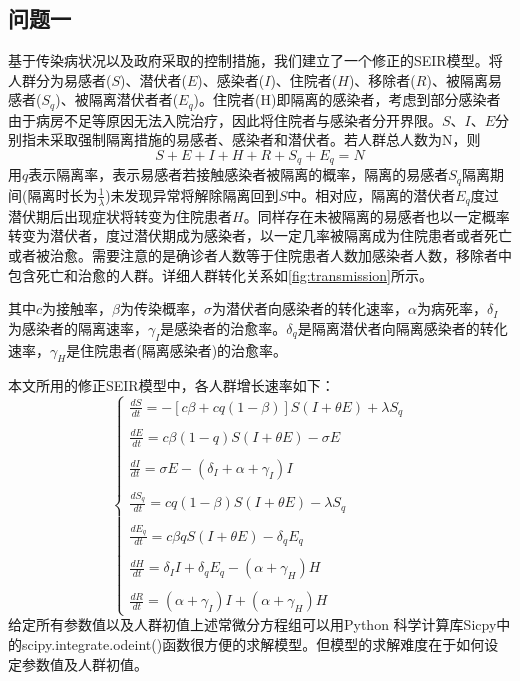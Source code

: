 \documentclass[withoutpre]{cumcmthesis} %
\begin{document}
\subsection{问题一}
基于传染病状况以及政府采取的控制措施，我们建立了一个修正的SEIR模型。将人群分为易感者($S$)、潜伏者($E$)、感染者($I$)、住院者($H$)、移除者($R$)、被隔离易感者($S_q$)、被隔离潜伏者者($E_q$)。住院者(H)即隔离的感染者，考虑到部分感染者由于病房不足等原因无法入院治疗，因此将住院者与感染者分开界限。$S$、$I$、$E$分别指未采取强制隔离措施的易感者、感染者和潜伏者。若人群总人数为N，则
\begin{equation}
    S + E + I + H + R + S_q + E_q = N
\end{equation}
用$q$表示隔离率，表示易感者若接触感染者被隔离的概率，隔离的易感者$S_q$隔离期间(隔离时长为$\frac{1}{\lambda}$)未发现异常将解除隔离回到$S$中。相对应，隔离的潜伏者$E_q$度过潜伏期后出现症状将转变为住院患者$H$。同样存在未被隔离的易感者也以一定概率转变为潜伏者，度过潜伏期成为感染者，以一定几率被隔离成为住院患者或者死亡或者被治愈。需要注意的是确诊者人数等于住院患者人数加感染者人数，移除者中包含死亡和治愈的人群。详细人群转化关系如\cref{fig:transmission}所示。

其中$c$为接触率，$\beta$为传染概率，$\sigma$为潜伏者向感染者的转化速率，$\alpha$为病死率，$\delta_I$为感染者的隔离速率，$\gamma_I$是感染者的治愈率。$\delta_q$是隔离潜伏者向隔离感染者的转化速率，$\gamma_H$是住院患者(隔离感染者)的治愈率。

本文所用的修正SEIR模型中，各人群增长速率如下：
\begin{equation}
    \left\{\begin{array}{l}
        \displaystyle \frac{d S}{d t}=-[  c \beta+  c q(1-\beta)] S(I+\theta E)+\lambda S_{q} \\ \\
        \displaystyle \frac{dE}{dt}=  c \beta(1-q) S(I+\theta E)-\sigma E \\ \\
        \displaystyle \frac{dI}{dt}=\sigma E-\left(\delta_{I}+\alpha+\gamma_{I}\right) I \\ \\
        \displaystyle \frac{dS_q}{dt} =  c q(1-\beta) S(I+\theta E)-\lambda S_{q} \\ \\
        \displaystyle \frac{dE_q}{dt}=  c \beta q S(I+\theta E)-\delta_{q} E_{q} \\ \\
        \displaystyle\frac{dH}{dt}=\delta_{I} I+\delta_{q} E_{q}-\left(\alpha+\gamma_{H}\right) H \\ \\
        \displaystyle\frac{dR}{dt}=(\alpha + \gamma_{I})I+(\alpha + \gamma_{H})H
        \end{array}\right.
    \label{equation:1}
\end{equation}
给定所有参数值以及人群初值上述常微分方程组可以用Python 科学计算库Sicpy中的scipy.integrate.odeint()函数很方便的求解模型。但模型的求解难度在于如何设定参数值及人群初值。
\end{document}
